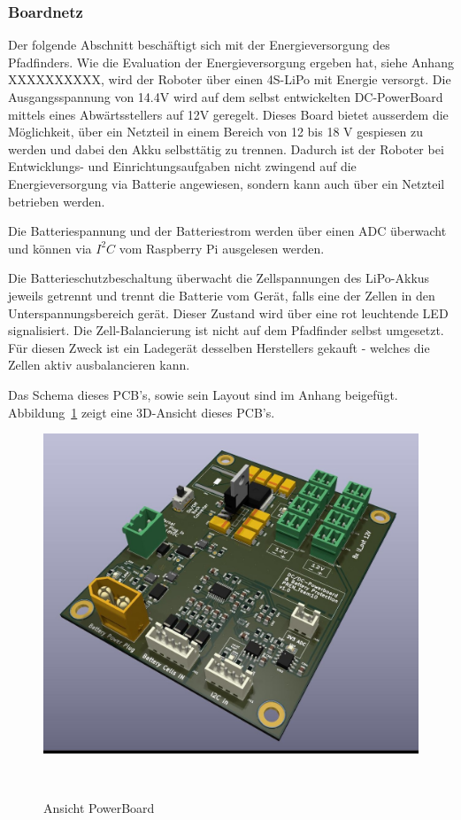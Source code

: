 \documentclass[main.tex]{subfiles} %
\begin{document}

\subsubsection{Boardnetz}

Der folgende Abschnitt beschäftigt sich mit der Energieversorgung des
Pfadfinders. Wie die Evaluation der Energieversorgung ergeben hat, siehe Anhang
XXXXXXXXXX, wird der Roboter über einen 4S-LiPo mit Energie versorgt. Die
Ausgangsspannung von 14.4V wird auf dem selbst entwickelten DC-PowerBoard
mittels eines Abwärtsstellers auf 12V geregelt. Dieses Board bietet ausserdem
die Möglichkeit, über ein Netzteil in einem Bereich von 12 bis 18 V gespiesen
zu werden und dabei den Akku selbsttätig zu trennen. Dadurch ist der Roboter
bei Entwicklungs- und Einrichtungsaufgaben nicht zwingend auf die
Energieversorgung via Batterie angewiesen, sondern kann auch über ein Netzteil
betrieben werden.

Die Batteriespannung und der Batteriestrom werden über einen ADC überwacht und
können via $I^2C$ vom Raspberry Pi ausgelesen werden.

Die Batterieschutzbeschaltung überwacht die Zellspannungen des LiPo-Akkus
jeweils getrennt und trennt die Batterie vom Gerät, falls eine der Zellen in
den Unterspannungsbereich gerät. Dieser Zustand wird über eine rot leuchtende
LED signalisiert. Die Zell-Balancierung ist nicht auf dem Pfadfinder selbst
umgesetzt. Für diesen Zweck ist ein Ladegerät desselben Herstellers gekauft -
welches die Zellen aktiv ausbalancieren kann.

Das Schema dieses PCB's, sowie sein Layout sind im Anhang beigefügt.
Abbildung~\ref{PowerBoard_Ansicht} zeigt eine 3D-Ansicht dieses PCB's.

\begin{figure}[H]
    \centering
    \includegraphics[width = 0.75\linewidth]{fig_Boardnetz/PowerDistributionBoard.jpg}
    \caption{Ansicht PowerBoard}~\label{PowerBoard_Ansicht}
\end{figure}
\end{document}
